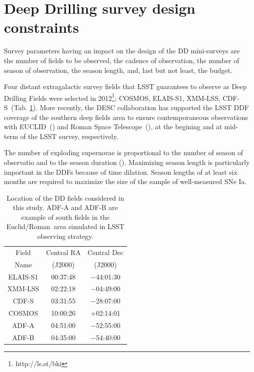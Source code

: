 \documentclass[skiphelvet,twocolumn]{lsstdescnote}
\newcommand{\cosmos}{{COSMOS}}
\newcommand{\elais}{{ELAIS-S1}}
\newcommand{\xmm}{{XMM-LSS}}
\newcommand{\cdfs}{{CDF-S}}
\newcommand{\adfa}{{ADF-A}}
\newcommand{\adfb}{{ADF-B}}
\newcommand{\adfs}{{Euclid/Roman}}
\newcommand{\euclid}{{EUCLID}}
\newcommand{\romanspace}{{\sc Roman Space Telescope}}
\newcommand{\sne}{{SNe Ia}}
\begin{document}
\section{Deep Drilling survey design constraints}
\label{sec:design}
Survey parameters having an impact on the design of the DD mini-surveys are the number of fields to be observed, the cadence of observation, the number of season of observation, the season length, and, last but not least, the budget.
\par
Four distant extragalactic survey fields that LSST guarantees to observe as Deep Drilling Fields were selected in 2012\footnote{http://ls.st/bki}: \cosmos, \elais, \xmm, \cdfs~(Tab. \ref{tab:locddf}). More recently, the DESC collaboration has supported the LSST DDF coverage of the southern deep fields area to ensure contemporaneous observations with \euclid~(\citealt{laureijs2011euclid,Amendola_2013}) and \romanspace~(\citealt{spergel2015widefield}), at the begining and at mid-term of the LSST survey, respectively.
\par
The number of exploding supernovae is proportional to the number of season of observatio and to the season duration (\citealt{perrett}). Maximizing season length is particularly important in the DDFs because of time dilation. Season lengths of at least six months are required to maximize the size of the sample of well-measured \sne.
\begin{table}[!htbp]
  \caption{Location of the DD fields considered in this study. ADF-A and ADF-B are example of south fields in the \adfs~area simulated in LSST observing strategy.}\label{tab:locddf}
  \begin{center}
    \begin{tabular}{c|c|c}
      \hline
      \hline
      Field & Central RA & Central Dec\\ 
      Name & (J2000)  & (J2000)\\
      \hline
     \elais & 00:37:48 & −44:01:30 \\
     \xmm & 02:22:18 &  −04:49:00 \\
     \cdfs & 03:31:55 & −28:07:00 \\
     \cosmos &10:00:26 & +02:14:01 \\
     \hline 
     \adfa & 04:51:00& −52:55:00 \\
     \adfb & 04:35:00 & −54:40:00 \\
      \hline
      \hline
      \end{tabular}
  \end{center}
\end{table}
\end{document}
